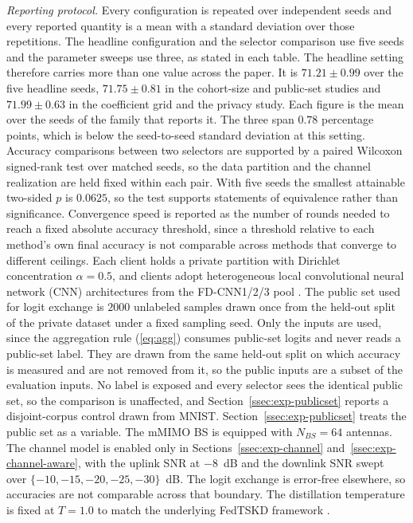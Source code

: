 \documentclass[journal]{IEEEtran}
\newcommand{\rev}[1]{{\color{blue}#1}}
\begin{document}
\rev{\textit{Reporting protocol.} Every configuration is repeated over independent seeds and every reported quantity is a mean with a standard deviation over those repetitions. The headline configuration and the selector comparison use five seeds and the parameter sweeps use three, as stated in each table. \rev{The headline setting therefore carries more than one value across the paper. It is $71.21 \pm 0.99$ over the five headline seeds, $71.75 \pm 0.81$ in the cohort-size and public-set studies and $71.99 \pm 0.63$ in the coefficient grid and the privacy study. Each figure is the mean over the seeds of the family that reports it. The three span $0.78$ percentage points, which is below the seed-to-seed standard deviation at this setting.} Accuracy comparisons between two selectors are supported by a paired Wilcoxon signed-rank test over matched seeds, so the data partition and the channel realization are held fixed within each pair. \rev{With five seeds the smallest attainable two-sided $p$ is $0.0625$, so the test supports statements of equivalence rather than significance.} Convergence speed is reported as the number of rounds needed to reach a fixed absolute accuracy threshold, since a threshold relative to each method's own final accuracy is not comparable across methods that converge to different ceilings.} Each client holds a private partition with Dirichlet concentration $\alpha = 0.5$, and clients adopt heterogeneous local convolutional neural network (CNN) architectures from the FD-CNN1/2/3 pool \cite{chan2021fedhe}. \rev{The public set used for logit exchange \cite{itahara2023distillation} is $2000$ unlabeled samples drawn once from the held-out split of the private dataset under a fixed sampling seed. Only the inputs are used, since the aggregation rule (\ref{eq:agg}) consumes public-set logits and never reads a public-set label. \rev{They are drawn from the same held-out split on which accuracy is measured and are not removed from it, so the public inputs are a subset of the evaluation inputs. No label is exposed and every selector sees the identical public set, so the comparison is unaffected, and Section~\ref{ssec:exp-publicset} reports a disjoint-corpus control drawn from MNIST.} Section~\ref{ssec:exp-publicset} treats the public set as a variable.} The mMIMO BS is equipped with $N_{BS} = 64$ antennas. \rev{The channel model is enabled only in Sections~\ref{ssec:exp-channel} and~\ref{ssec:exp-channel-aware}, with the uplink SNR at $-8$~dB and the downlink SNR swept over $\{-10,-15,-20,-25,-30\}$~dB. The logit exchange is error-free elsewhere, so accuracies are not comparable across that boundary.} The distillation temperature is fixed at $T = 1.0$ to match the underlying FedTSKD framework \cite{mu2024fedtskd}.
\end{document}
